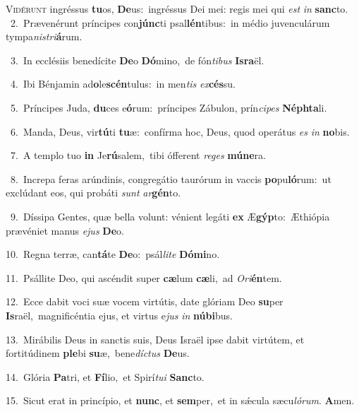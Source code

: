 \lettrine{\initial\textcolor{\initialcolor}{V}}{idérunt} ingréssus \textbf{tu}\-os, \textbf{De}\-us:~\star ingréssus Dei mei: regis mei qui \textit{est} \textit{in} \textbf{sanc}\-to.\\
{\numbfont\textcolor{\numbcolor}{~2.}}~Prævenérunt príncipes con\-\textbf{júnc}\-ti psal\-\textbf{lén}\-tibus:~\star in médio juvenculárum tympa\-\textit{nis}\-\textit{tri}\textbf{á}rum.\par
{\numbfont\textcolor{\numbcolor}{~3.}}~In ecclésiis benedícite \textbf{De}\-o \textbf{Dó}\-mino,~\star de fón\-\textit{ti}\-\textit{bus} \textbf{Is}\-\textbf{ra}ël.\par
{\numbfont\textcolor{\numbcolor}{~4.}}~Ibi Bénjamin ad\-\textbf{o}\-le\-\textbf{scén}\-tulus:~\star in men\textit{tis} \textit{ex}\-\textbf{cés}su.\par
{\numbfont\textcolor{\numbcolor}{~5.}}~Príncipes Juda, \textbf{du}\-ces e\-\textbf{ó}\-rum:~\star príncipes Zábulon, prín\-\textit{ci}\-\textit{pes} \textbf{Néph}\-\textbf{ta}li.\par
{\numbfont\textcolor{\numbcolor}{~6.}}~Manda, Deus, vir\-\textbf{tú}\-ti \textbf{tu}\-æ:~\star confírma hoc, Deus, quod operátus \textit{es} \textit{in} \textbf{no}\-bis.\par
{\numbfont\textcolor{\numbcolor}{~7.}}~A templo tuo \textbf{in} Je\-\textbf{rú}\-salem,~\star tibi ófferent \textit{re}\-\textit{ges} \textbf{mú}\-\textbf{ne}ra.\par
{\numbfont\textcolor{\numbcolor}{~8.}}~Increpa feras arúndinis, congregátio taurórum in vaccis \textbf{po}\-pu\-\textbf{ló}\-rum:~\star ut exclúdant eos, qui probáti \textit{sunt} \textit{ar}\-\textbf{gén}to.\par
{\numbfont\textcolor{\numbcolor}{~9.}}~Díssipa Gentes, quæ bella volunt: vénient legáti \textbf{ex} Æ\-\textbf{gýp}\-to:~\star Æthiópia prævéniet manus \textit{e}\-\textit{jus} \textbf{De}\-o.\par
{\numbfont\textcolor{\numbcolor}{10.}}~Regna terræ, can\-\textbf{tá}\-te \textbf{De}\-o:~\star psál\-\textit{li}\-\textit{te} \textbf{Dó}\-\textbf{mi}no.\par
{\numbfont\textcolor{\numbcolor}{11.}}~Psállite Deo, qui ascéndit super \textbf{cæ}\-lum \textbf{cæ}\-li,~\star ad \textit{O}\-\textit{ri}\textbf{én}tem.\par
{\numbfont\textcolor{\numbcolor}{12.}}~Ecce dabit voci suæ vocem virtútis, date glóriam Deo \textbf{su}\-per \textbf{Is}\-raël,~\star magnificéntia ejus, et virtus e\textit{jus} \textit{in} \textbf{nú}\-\textbf{bi}bus.\par
{\numbfont\textcolor{\numbcolor}{13.}}~Mirábilis Deus in sanctis suis, Deus Israël ipse dabit virtútem, et fortitúdinem \textbf{ple}\-bi \textbf{su}\-æ,~\star bene\-\textit{díc}\-\textit{tus} \textbf{De}\-us.\par
{\numbfont\textcolor{\numbcolor}{14.}}~Glória \textbf{Pa}\-tri, et \textbf{Fí}\-lio,~\star et Spirí\-\textit{tu}\-\textit{i} \textbf{Sanc}\-to.\par
{\numbfont\textcolor{\numbcolor}{15.}}~Sicut erat in princípio, et \textbf{nunc}\-, et \textbf{sem}\-per,~\star et in sǽcula sæcu\-\textit{ló}\-\textit{rum}. \textbf{A}\-men.\par
